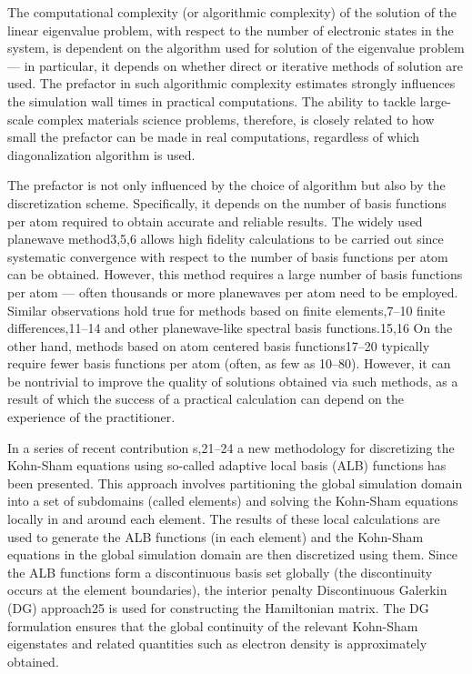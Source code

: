 \documentclass[
  10
]{article}
\begin{document}
The computational complexity (or algorithmic complexity) of the solution
of the linear eigenvalue problem, with respect to the number of
electronic states in the system, is dependent on the algorithm used for
solution of the eigenvalue problem --- in particular, it depends on
whether direct or iterative methods of solution are used. The prefactor
in such algorithmic complexity estimates strongly influences the
simulation wall times in practical computations. The ability to tackle
large-scale complex materials science problems, therefore, is closely
related to how small the prefactor can be made in real computations,
regardless of which diagonalization algorithm is used.

The prefactor is not only influenced by the choice of algorithm but also
by the discretization scheme. Specifically, it depends on the number of
basis functions per atom required to obtain accurate and reliable
results. The widely used planewave method3,5,6 allows high fidelity
calculations to be carried out since systematic convergence with respect
to the number of basis functions per atom can be obtained. However, this
method requires a large number of basis functions per atom --- often
thousands or more planewaves per atom need to be employed. Similar
observations hold true for methods based on finite elements,7--10 finite
differences,11--14 and other planewave-like spectral basis
functions.15,16 On the other hand, methods based on atom centered basis
functions17--20 typically require fewer basis functions per atom (often,
as few as 10--80). However, it can be nontrivial to improve the quality
of solutions obtained via such methods, as a result of which the success
of a practical calculation can depend on the experience of the
practitioner.

In a series of recent contribution s,21--24 a new methodology for
discretizing the Kohn-Sham equations using so-called adaptive local
basis (ALB) functions has been presented. This approach involves
partitioning the global simulation domain into a set of subdomains
(called elements) and solving the Kohn-Sham equations locally in and
around each element. The results of these local calculations are used to
generate the ALB functions (in each element) and the Kohn-Sham equations
in the global simulation domain are then discretized using them. Since
the ALB functions form a discontinuous basis set globally (the
discontinuity occurs at the element boundaries), the interior penalty
Discontinuous Galerkin (DG) approach25 is used for constructing the
Hamiltonian matrix. The DG formulation ensures that the global
continuity of the relevant Kohn-Sham eigenstates and related quantities
such as electron density is approximately obtained.
\end{document}
